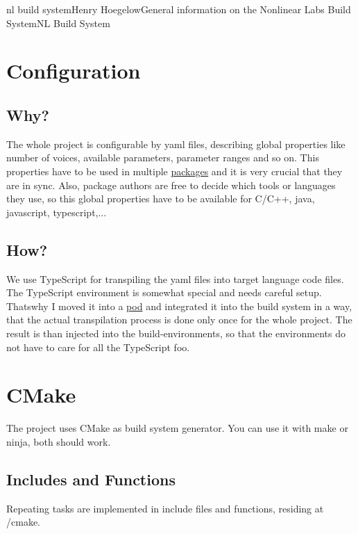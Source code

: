 \documentclass[11pt]{article}
\begin{document}
\begin{Name}{1}{nl build system}{Henry Hoegelow}{General information on the Nonlinear Labs Build System}{NL Build System}
\section{Configuration}

\subsection{Why?} \label{whygenerated}
The whole project is configurable by yaml files, describing global properties like number of voices, available parameters, parameter ranges and so on. This properties have to be used in multiple \hyperref[packages]{packages} and it is very crucial that they are in sync. Also, package authors are free to decide which tools or languages they use, so this global properties have to be available for C/C++, java, javascript, typescript,...

\subsection{How?}
We use TypeScript for transpiling the yaml files into target language code files. The TypeScript environment is somewhat special and needs careful setup. Thatswhy I moved it into a \hyperref[pod]{pod} and integrated it into the build system in a way, that the actual transpilation process is done only once for the whole project. The result is than injected into the build-environments, so that the environments do not have to care for all the TypeScript foo.

\section{CMake}
The project uses CMake as build system generator. You can use it with make or ninja, both should work.

\subsection{Includes and Functions}
Repeating tasks are implemented in include files and functions, residing at /cmake.


\end{Name}
\end{document}
